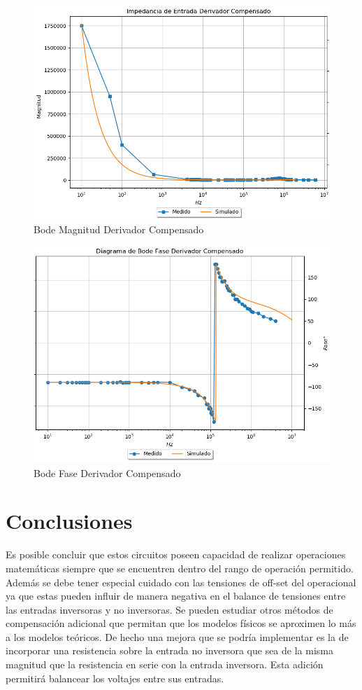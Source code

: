 \documentclass[a4paper]{article}
\begin{document}
\begin{figure}[H]
	\centering
	\includegraphics[width=\textwidth]{Ejercicio4/SUPERPOSICION-ZIN-DERIVADOR-COMPENSADO-MAGNITUD} 
	\caption{Bode Magnitud Derivador Compensado}
\end{figure}

\begin{figure}[H]
	\centering
	\includegraphics[width=\textwidth]{Ejercicio4/SUPERPOSICION-FASE-DERIVADOR-COMPENSADO} 
	\caption{Bode Fase Derivador Compensado}
\end{figure}

\section{Conclusiones}
Es posible concluir que estos circuitos poseen capacidad de realizar operaciones matemáticas siempre que se encuentren dentro del rango de operación permitido. 
Además se debe tener especial cuidado con las tensiones de off-set del operacional ya que estas pueden influir de manera negativa en el balance de tensiones entre las entradas inversoras y no inversoras. Se pueden estudiar otros métodos de compensación adicional que permitan que los modelos físicos se aproximen lo más a los modelos teóricos. De hecho una mejora que se podría implementar es la de incorporar una resistencia sobre la entrada no inversora que sea de la misma magnitud que la resistencia en serie con la entrada inversora. Esta adición permitirá balancear los voltajes entre sus entradas.   
\end{document}
